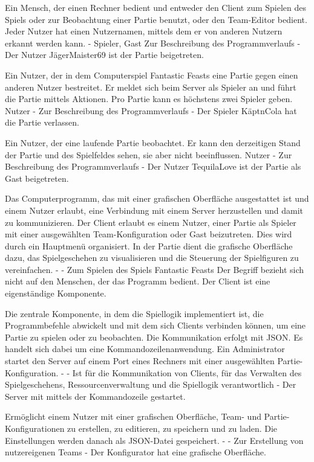 {Ein Mensch, der einen Rechner bedient und entweder den Client zum Spielen des Spiels oder zur Beobachtung einer Partie benutzt, oder den Team-Editor bedient. Jeder Nutzer hat einen Nutzernamen, mittels dem er von anderen Nutzern erkannt werden kann.}
{-}
{Spieler, Gast}
{Zur Beschreibung des Programmverlaufs}
{-}
{Der Nutzer JägerMaister69 ist der Partie beigetreten.}

{Ein Nutzer, der in dem Computerspiel \glqq{}Fantastic Feasts\grqq{} eine Partie gegen einen anderen Nutzer bestreitet. Er meldet sich beim Server als Spieler an und führt die Partie mittels Aktionen. Pro Partie kann es höchstens zwei Spieler geben.}
{Nutzer}
{-}
{Zur Beschreibung des Programmverlaufs}
{-}
{Der Spieler KäptnCola hat die Partie verlassen.}

{Ein Nutzer, der eine laufende Partie beobachtet. Er kann den derzeitigen Stand der Partie und des Spielfeldes sehen, sie aber nicht beeinflussen.}
{Nutzer}
{-}
{Zur Beschreibung des Programmverlaufs}
{-}
{Der Nutzer TequilaLove ist der Partie als Gast beigetreten.}

{Das Computerprogramm, das mit einer grafischen Oberfläche ausgestattet ist und einem Nutzer erlaubt, eine Verbindung mit einem Server herzustellen und damit zu kommunizieren. Der Client erlaubt es einem Nutzer, einer Partie als Spieler mit einer ausgewählten Team-Konfiguration oder Gast beizutreten. Dies wird durch ein Hauptmenü organisiert. In der Partie dient die grafische Oberfläche dazu, das Spielgeschehen zu visualisieren und die Steuerung der Spielfiguren zu vereinfachen.}
{-}
{-}
{Zum Spielen des Spiels \glqq{}Fantastic Feasts\grqq{}}
{Der Begriff bezieht sich nicht auf den Menschen, der das Programm bedient.}
{Der Client ist eine eigenständige Komponente.}

{Die zentrale Komponente, in dem die Spiellogik implementiert ist, die Programmbefehle abwickelt und mit dem sich Clients verbinden können, um eine Partie zu spielen oder zu beobachten. Die Kommunikation erfolgt mit JSON. Es handelt sich dabei um eine Kommandozeilenanwendung. Ein Administrator startet den Server auf einem Port eines Rechners mit einer ausgewählten Partie-Konfiguration.}
{-}
{-}
{Ist für die Kommunikation von Clients, für das Verwalten des Spielgeschehens, Ressourcenverwaltung und die Spiellogik verantwortlich}
{-}
{Der Server mit mittels der Kommandozeile gestartet.}

{Ermöglicht einem Nutzer mit einer grafischen Oberfläche, Team- und Partie-Konfigurationen zu erstellen, zu editieren, zu speichern und zu laden. Die Einstellungen werden danach als JSON-Datei gespeichert.}
{-}
{-}
{Zur Erstellung von nutzereigenen Teams}
{-}
{Der Konfigurator hat eine grafische Oberfläche.}

